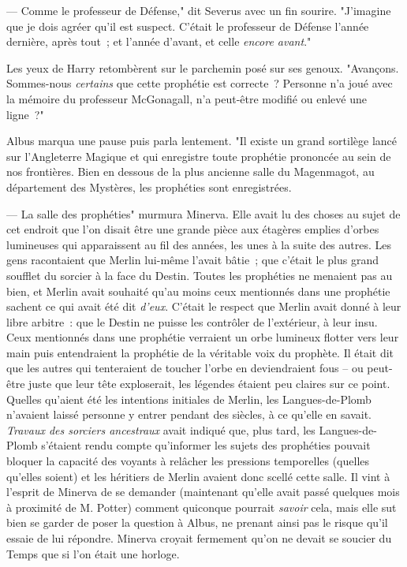 --- Comme le professeur de Défense," dit Severus avec un fin sourire. "J'imagine que je dois agréer qu'il est suspect. C'était le professeur de Défense l'année dernière, après tout~; et l'année d'avant, et celle \emph{encore avant}."

Les yeux de Harry retombèrent sur le parchemin posé sur ses genoux. "Avançons. Sommes-nous \emph{certains} que cette prophétie est correcte~? Personne n'a joué avec la mémoire du professeur McGonagall, n'a peut-être modifié ou enlevé une ligne~?"

Albus marqua une pause puis parla lentement. "Il existe un grand sortilège lancé sur l'Angleterre Magique et qui enregistre toute prophétie prononcée au sein de nos frontières. Bien en dessous de la plus ancienne salle du Magenmagot, au département des Mystères, les prophéties sont enregistrées.

--- La salle des prophéties" murmura Minerva. Elle avait lu des choses au sujet de cet endroit que l'on disait être une grande pièce aux étagères emplies d'orbes lumineuses qui apparaissent au fil des années, les unes à la suite des autres. Les gens racontaient que Merlin lui-même l'avait bâtie~; que c'était le plus grand soufflet du sorcier à la face du Destin. Toutes les prophéties ne menaient pas au bien, et Merlin avait souhaité qu'au moins ceux mentionnés dans une prophétie sachent ce qui avait été dit \emph{d'eux}. C'était le respect que Merlin avait donné à leur libre arbitre~: que le Destin ne puisse les contrôler de l'extérieur, à leur insu. Ceux mentionnés dans une prophétie verraient un orbe lumineux flotter vers leur main puis entendraient la prophétie de la véritable voix du prophète. Il était dit que les autres qui tenteraient de toucher l'orbe en deviendraient fous -- ou peut-être juste que leur tête exploserait, les légendes étaient peu claires sur ce point. Quelles qu'aient été les intentions initiales de Merlin, les Langues-de-Plomb n'avaient laissé personne y entrer pendant des siècles, à ce qu'elle en savait. \emph{Travaux des sorciers ancestraux} avait indiqué que, plus tard, les Langues-de-Plomb s'étaient rendu compte qu'informer les sujets des prophéties pouvait bloquer la capacité des voyants à relâcher les pressions temporelles (quelles qu'elles soient) et les héritiers de Merlin avaient donc scellé cette salle. Il vint à l'esprit de Minerva de se demander (maintenant qu'elle avait passé quelques mois à proximité de M. Potter) comment quiconque pourrait \emph{savoir} cela, mais elle sut bien se garder de poser la question à Albus, ne prenant ainsi pas le risque qu'il essaie de lui répondre. Minerva croyait fermement qu'on ne devait se soucier du Temps que si l'on était une horloge.


